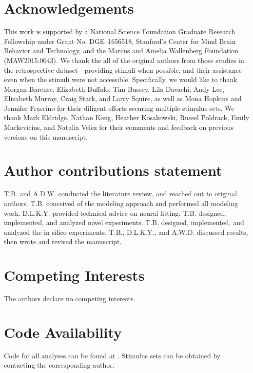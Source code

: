 \documentclass[11pt]{article}
\begin{document}



\section{Acknowledgements}

This work is supported by a National Science Foundation Graduate Research Fellowship under Grant No. DGE–1656518, Stanford’s Center for Mind Brain Behavior and Technology, and the Marcus and Amelia Wallenberg Foundation (MAW2015.0043). We thank the all of the original authors from those studies in the retrospective dataset---providing stimuli when possible, and their assistance even when the stimuli were not accessible. Specifically, we would like to thank Morgan Barense, Elizabeth Buffalo, Tim Bussey, Lila Davachi, Andy Lee, Elizabeth Murray, Craig Stark, and Larry Squire, as well as Mona Hopkins and Jennifer Frascino for their diligent efforts securing multiple stimulus sets. We thank Mark Eldridge, Nathan Kong, Heather Kosakowski, Russel Poldrack, Emily Mackevicius, and Natalia Vel$\acute{\text{e}}$z for their comments and feedback on previous versions on this manuscript. 

\section{Author contributions statement}

T.B. and A.D.W. conducted the literature review, and reached out to original authors. T.B. conceived of the modeling approach and performed all modeling work. D.L.K.Y. provided technical advice on neural fitting. T.B. designed, implemented, and analyzed novel experiments. T.B. designed, implemented, and analyzed the in silico experiments. T.B., D.L.K.Y., and A.W.D. discussed results, then wrote and revised the manuscript. 

\section{Competing Interests}

The authors declare no competing interests.

\section{Code Availability}

Code for all analyses can be found at \href{https://github.com/neuroailab/mtl\_perception}{\color{blue}{https://github.com/neuroailab/mtl\_perception}}. Stimulus sets can be obtained by contacting the corresponding author. 
\end{document}
